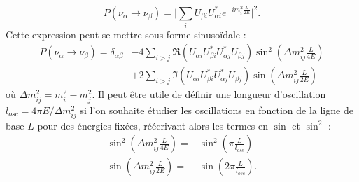             \begin{equation*}
                P(\nu_{\alpha}\to\nu_{\beta}) = \bigg|\sum_i U_{\beta i}U_{\alpha i}^* e^{-im_i^2\frac{L}{2E}}\bigg|^2.
            \end{equation*}
            Cette expression peut se mettre sous forme sinusoïdale\cite{Mondal2015} :
            \begin{equation}\label{eq::proba_oscillation}
                \begin{split}
                    P(\nu_{\alpha}\to\nu_{\beta}) = \delta_{\alpha\beta} & - 4\sum_{i>j}\Re(U_{\alpha i}U_{\beta i}^*U_{\alpha j}^*U_{\beta j})\sin^2\left(\Delta m_{ij}^2\frac{L}{4E}\right) \\
                    & +2\sum_{i>j}\Im(U_{\alpha i}U_{\beta i}^*U_{\alpha j}^*U_{\beta j})\sin\left(\Delta m_{ij}^2\frac{L}{2E}\right)
                \end{split}
            \end{equation}
            où $\Delta m_{ij}^2 = m_i^2-m_j^2$. Il peut être utile de définir une longueur d'oscillation $l_{osc} = 4\pi E/\Delta m_{ij}^2$ si l'on souhaite étudier les oscillations en fonction de la ligne de base $L$ pour des énergies fixées, réécrivant alors les termes en $\sin$ et $\sin^2$ :
            \begin{eqnarray}
                \sin^2\left(\Delta m_{ij}^2\frac{L}{4E}\right) = &  \sin^2\left(\pi\frac{L}{l_{osc}}\right) \\
                \sin\left(\Delta m_{ij}^2\frac{L}{2E}\right) = & \sin\left(2\pi\frac{L}{l_{osc}}\right).
            \end{eqnarray}
            

